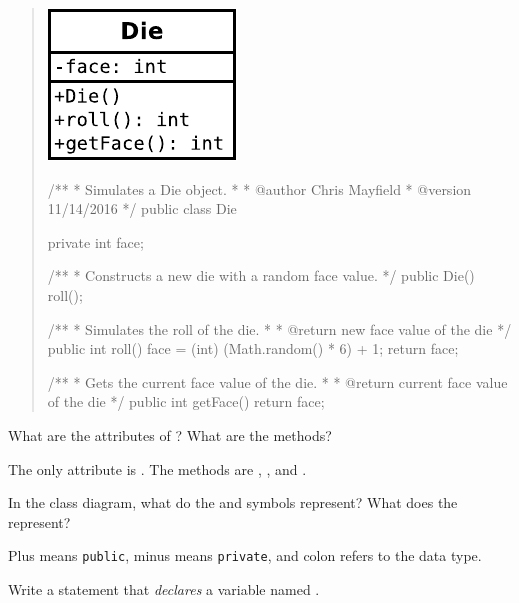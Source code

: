 \label{CS1/class-die}

\begin{quote}
\hfill\includegraphics{CS1/Die.pdf}
\vspace*{-84pt}

\begin{javalst}
/**
 * Simulates a Die object.
 * 
 * @author Chris Mayfield
 * @version 11/14/2016
 */
public class Die {
    
    private int face;
    
    /**
     * Constructs a new die with a random face value.
     */
    public Die() {
        roll();
    }
    
    /**
     * Simulates the roll of the die.
     *
     * @return new face value of the die
     */
    public int roll() {
        face = (int) (Math.random() * 6) + 1;
        return face;
    }
    
    /**
     * Gets the current face value of the die.
     *
     * @return current face value of the die
     */
    public int getFace() {
        return face;
    }
    
}
\end{javalst}
\end{quote}




\Q What are the attributes of ? What are the methods?

\begin{answer}
The only attribute is . The methods are , , and .
\end{answer}


\Q In the class diagram, what do the \java{-} and \java{+} symbols represent? What does the \java{:} represent?

\begin{answer}
Plus means {\tt public}, minus means {\tt private}, and colon refers to the data type.
\end{answer}


\Q Write a statement that \emph{declares} a  variable named .

